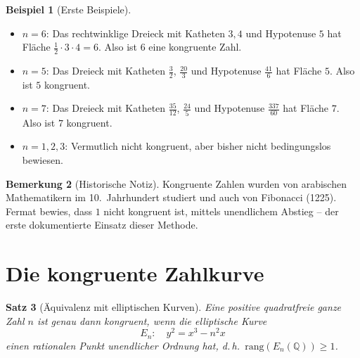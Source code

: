 \documentclass[12pt,a4paper]{amsart}
\newtheorem{theorem}{Satz}[section]
\theoremstyle{definition}
\newtheorem{remark}[theorem]{Bemerkung}
\newtheorem{example}[theorem]{Beispiel}
\newcommand{\Q}{\mathbb{Q}}
\begin{document}
\begin{example}[Erste Beispiele]
\begin{itemize}
  \item $n = 6$: Das rechtwinklige Dreieck mit Katheten $3, 4$ und
    Hypotenuse $5$ hat Fl\"ache $\tfrac{1}{2} \cdot 3 \cdot 4 = 6$.
    Also ist $6$ eine kongruente Zahl.
  \item $n = 5$: Das Dreieck mit Katheten $\tfrac{3}{2}$, $\tfrac{20}{3}$
    und Hypotenuse $\tfrac{41}{6}$ hat Fl\"ache $5$.
    Also ist $5$ kongruent.
  \item $n = 7$: Das Dreieck mit Katheten $\tfrac{35}{12}$, $\tfrac{24}{5}$
    und Hypotenuse $\tfrac{337}{60}$ hat Fl\"ache $7$.
    Also ist $7$ kongruent.
  \item $n = 1, 2, 3$: Vermutlich nicht kongruent, aber bisher nicht
    bedingungslos bewiesen.
\end{itemize}
\end{example}

\begin{remark}[Historische Notiz]
Kongruente Zahlen wurden von arabischen Mathematikern im 10.~Jahrhundert
studiert und auch von Fibonacci (1225).
Fermat bewies, dass $1$ nicht kongruent ist, mittels unendlichem Abstieg --
der erste dokumentierte Einsatz dieser Methode.
\end{remark}

\section{Die kongruente Zahlkurve}

\begin{theorem}[\"Aquivalenz mit elliptischen Kurven]
\label{thm:equiv}
Eine positive quadratfreie ganze Zahl $n$ ist genau dann kongruent,
wenn die elliptische Kurve
\[
  E_n: \quad y^2 = x^3 - n^2 x
\]
einen rationalen Punkt unendlicher Ordnung hat, d.\,h.\
$\mathrm{rang}(E_n(\Q)) \ge 1$.
\end{theorem}
\end{document}
